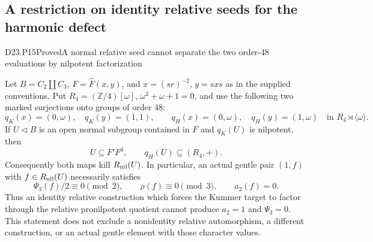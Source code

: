 \subsection{A restriction on identity relative seeds for the harmonic defect}

\begin{statement}{D23.P15}{Proved}{A normal relative seed cannot separate the two order-48 evaluations by nilpotent factorization}
\end{statement}
Let $B=C_2\amalg C_3$, $F=\widehat F(x,y)$, and
$x=(sr)^{-2}$, $y=sxs$ as in the supplied conventions. Put
$R_4=(\mathbb Z/4)[\omega]$, $\omega^2+\omega+1=0$, and use
the following two marked surjections onto groups of order $48$:
\[
 q_K(x)=(0,\omega),\quad q_K(y)=(1,1),\qquad
 q_H(x)=(0,\omega),\quad q_H(y)=(1,\omega)
 \quad\text{in }R_4\rtimes\langle\omega\rangle.
\]
If $U\triangleleft B$ is an open normal subgroup contained in $F$
and $q_K(U)$ is nilpotent, then
\[
 U\subseteq F'F^3,\qquad q_H(U)\subseteq(R_4,+).
 \tag{D23.P15.1}
\]
Consequently both maps kill $R_{\rm nil}(U)$. In particular, an
actual gentle pair $(1,f)$ with
$f\in R_{\rm nil}(U)$ necessarily satisfies
\[
 \Psi_3(f)/2\equiv0\pmod2,
 \qquad \rho(f)\equiv0\pmod3,
 \qquad a_2(f)=0.
 \tag{D23.P15.2}
\]
Thus an identity relative construction which forces the Kummer
target to factor through the relative pronilpotent quotient cannot
produce $a_2=1$ and $\Psi_3=0$. This statement does not exclude a
nonidentity relative automorphism, a different construction, or an
actual gentle element with those character values.

